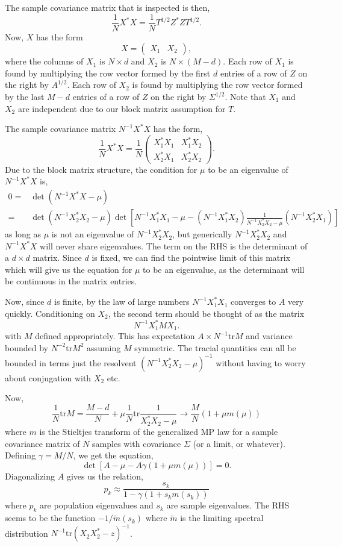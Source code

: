 \documentclass[11 pt, reqno]{article}
\def\beq{\begin{equation}}
\def\eeq{\end{equation}}
\def\tr{\mathrm{tr}}
\begin{document}
The sample covariance matrix that is inspected is then,
\beq
\frac{1}{N} X^* X = \frac{1}{N} T^{1/2} Z^* Z T^{1/2}.
\eeq
Now, $X$ has the form
\beq
X = \left( \begin{matrix} X_1 & X_2 \end{matrix} \right),
\eeq
where the columns of $X_1$ is $N \times d$ and $X_2$ is $N \times (M-d)$.   Each row of $X_1$ is found by multiplying the row vector formed by the first $d$ entries of a row of $Z$ on the right by $A^{1/2}$.  Each row of $X_2$ is found by multiplying the row vector formed by the last $M-d$ entries of a row of $Z$ on the right by $\Sigma^{1/2}$.  Note that $X_1$ and $X_2$ are independent due to our block matrix assumption for $T$.

The sample covariance matrix $N^{-1} X^* X$ has the form,
\beq
\frac{1}{N} X^* X = \frac{1}{N} \left( \begin{matrix} X_1^* X_1 & X_1^* X_2 \\ X_2^* X_1 & X_2^* X_2 \end{matrix} \right).
\eeq
Due to the block matrix structure, the condition for $\mu$ to be an eigenvalue of $N^{-1} X^* X$ is,
\begin{align}
0=& \det ( N^{-1} X^* X - \mu ) \\
=& \det ( N^{-1} X_2^* X_2 - \mu ) \det \left[ N^{-1} X_1^* X_1 - \mu - (N^{-1} X_1^* X_2 ) \frac{1}{ N^{-1} X_2^* X_2 - \mu } ( N^{-1} X_2^* X_1 ) \right]
\end{align}
as long as $\mu$ is not an eigenvalue of $N^{-1} X_2^* X_2$, but generically  $N^{-1} X_2^* X_2$ and $N^{-1} X^* X$ will never share eigenvalues.  The term on the RHS is the determinant of a $d \times d$ matrix.  Since $d$ is fixed, we can find the pointwise limit of this matrix which will give us the equation for $\mu$ to be an eigenvalue, as the determinant will be continuous in the matrix entries.

 Now, since $d$ is finite, by the law of large numbers $N^{-1} X_1^* X_1$ converges to $A$ very quickly.   Conditioning on $X_2$, the second term should be thought of as the matrix 
\beq
N^{-1} X_1^* M  X_1.
\eeq
with $M$ defined appropriately.  This has expectation $A \times N^{-1} \tr M$ and variance bounded by $N^{-2} \tr M^2$ assuming $M$ symmetric.   The tracial quantities can all be bounded in terms just the resolvent $(N^{-1} X_2^* X_2 - \mu )^{-1}$ without having to worry about conjugation with $X_2$ etc.

Now,
\beq
\frac{1}{N} \tr M = \frac{M-d}{N} + \mu \frac{1}{N} \tr \frac{1}{ X_2^* X_2 - \mu } \to \frac{M}{N}\left(1  + \mu m  (\mu) \right)
\eeq
where $m$ is the Stieltjes transform of the generalized MP law for a sample covariance matrix of $N$ samples with covariance $\Sigma$ (or a limit, or whatever). Defining $\gamma = M / N$, we get the equation,
\beq
\det \left[ A - \mu - A \gamma(1  + \mu m ( \mu )) \right] = 0.
\eeq
Diagonalizing $A$ gives us the relation,
\beq
p_k \approx \frac{ s_k}{ 1 - \gamma ( 1 + s_k m (s_k ) ) }
\eeq
where $p_k$ are population eigenvalues and $s_k$ are sample eigenvalues. The RHS seems to be the function $- 1 / \tilde{m} ( s_k)$ where $\tilde{m}$ is the limiting spectral distribution $N^{-1} \tr ( X_2 X_2^* -z )^{-1}$.
\end{document}
